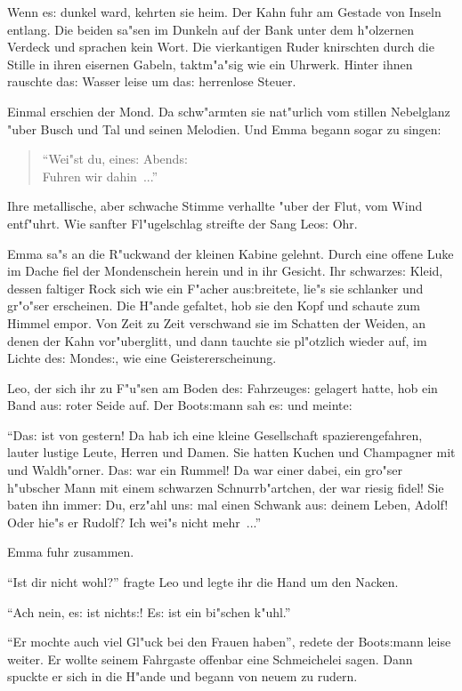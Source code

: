 \documentclass[oneside,12pt]{book}
\newcommand{\s}{s:}%
\begin{document}
Wenn e{\s} dunkel ward, kehrten sie heim. Der Kahn fuhr am Gestade
von Inseln entlang. Die beiden sa"sen im Dunkeln auf der Bank
unter dem h"olzernen Verdeck und sprachen kein Wort. Die
vierkantigen Ruder knirschten durch die Stille in ihren eisernen
Gabeln, taktm"a"sig wie ein Uhrwerk. Hinter ihnen rauschte da{\s}
Wasser leise um da{\s} herrenlose Steuer.

Einmal erschien der Mond. Da schw"armten sie nat"urlich vom
stillen Nebelglanz "uber Busch und Tal und seinen Melodien. Und
Emma begann sogar zu singen: 
\begin{verse}
"`Wei"st du, eine{\s} Abend{\s} \\
Fuhren wir dahin~..."'
\end{verse}

Ihre metallische, aber schwache Stimme verhallte "uber der Flut,
vom Wind entf"uhrt. Wie sanfter Fl"ugelschlag streifte der Sang
Leo{\s} Ohr.

Emma sa"s an die R"uckwand der kleinen Kabine gelehnt. Durch eine
offene Luke im Dache fiel der Mondenschein herein und in ihr
Gesicht. Ihr schwarze{\s} Kleid, dessen faltiger Rock sich wie ein
F"acher au{\s}breitete, lie"s sie schlanker und gr"o"ser
erscheinen. Die H"ande gefaltet, hob sie den Kopf und schaute zum
Himmel empor. Von Zeit zu Zeit verschwand sie im Schatten der
Weiden, an denen der Kahn vor"uberglitt, und dann tauchte sie
pl"otzlich wieder auf, im Lichte de{\s} Monde{\s}, wie eine
Geistererscheinung.

Leo, der sich ihr zu F"u"sen am Boden de{\s} Fahrzeuge{\s}
gelagert hatte, hob ein Band au{\s} roter Seide auf. Der
Boot{\s}mann sah e{\s} und meinte:

"`Da{\s} ist von gestern! Da hab ich eine kleine Gesellschaft
spazierengefahren, lauter lustige Leute, Herren und Damen. Sie
hatten Kuchen und Champagner mit und Waldh"orner. Da{\s} war ein
Rummel! Da war einer dabei, ein gro"ser h"ubscher Mann mit einem
schwarzen Schnurrb"artchen, der war riesig fidel! Sie baten ihn
immer: {\glq}Du, erz"ahl un{\s} mal einen Schwank au{\s} deinem
Leben, Adolf!{\grq} Oder hie"s er Rudolf? Ich wei"s nicht mehr~..."'

Emma fuhr zusammen.

"`Ist dir nicht wohl?"' fragte Leo und legte ihr die Hand um den
Nacken.

"`Ach nein, e{\s} ist nicht{\s}! E{\s} ist ein bi"schen k"uhl."'

"`Er mochte auch viel Gl"uck bei den Frauen haben"', redete der
Boot{\s}mann leise weiter. Er wollte seinem Fahrgaste offenbar
eine Schmeichelei sagen. Dann spuckte er sich in die H"ande und
begann von neuem zu rudern.
\end{document}
